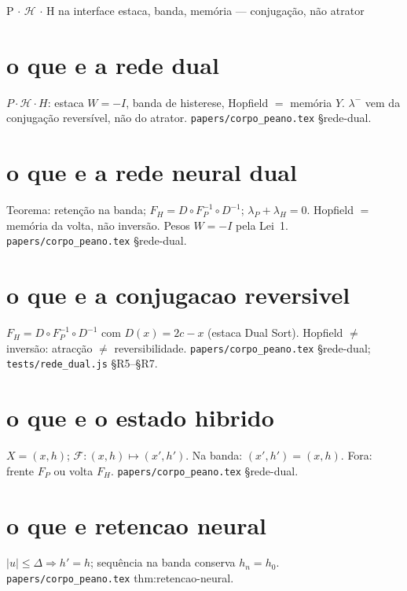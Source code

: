\documentclass[11pt,a4paper]{article}
\newcommand{\code}[1]{\texttt{\small #1}}
\begin{document}
       {P $\cdot$ $\mathcal{H}$ $\cdot$ H na interface}
       {estaca, banda, memória --- conjugação, não atrator}
\maketitle
\begin{abstract}
Pares curtos do Teorema da Rede Dual.
Detalhe: \code{papers/corpo\_peano.tex} \S rede-dual.
UI: \code{app/src/rede\_dual.js}; medidor \code{tests/rede\_dual.js}.
\end{abstract}

\section{o que e a rede dual}
$P\cdot\mathcal{H}\cdot H$: estaca $W=-I$, banda de histerese, Hopfield $=$ memória $Y$.
$\lambda^{-}$ vem da conjugação reversível, não do atrator.
\code{papers/corpo\_peano.tex} \S rede-dual.

\section{o que e a rede neural dual}
Teorema: retenção na banda; $F_H=D\circ F_P^{-1}\circ D^{-1}$; $\lambda_P+\lambda_H=0$.
Hopfield $=$ memória da volta, não inversão. Pesos $W=-I$ pela Lei~1.
\code{papers/corpo\_peano.tex} \S rede-dual.

\section{o que e a conjugacao reversivel}
$F_H=D\circ F_P^{-1}\circ D^{-1}$ com $D(x)=2c-x$ (estaca Dual Sort).
Hopfield $\neq$ inversão: atracção $\neq$ reversibilidade.
\code{papers/corpo\_peano.tex} \S rede-dual; \code{tests/rede\_dual.js} §R5--§R7.

\section{o que e o estado hibrido}
$X=(x,h)$; $\mathcal{F}\colon(x,h)\mapsto(x',h')$.
Na banda: $(x',h')=(x,h)$. Fora: frente $F_P$ ou volta $F_H$.
\code{papers/corpo\_peano.tex} \S rede-dual.

\section{o que e retencao neural}
$|u|\le\Delta\Rightarrow h'=h$; sequência na banda conserva $h_n=h_0$.
\code{papers/corpo\_peano.tex} thm:retencao-neural.
\end{document}
